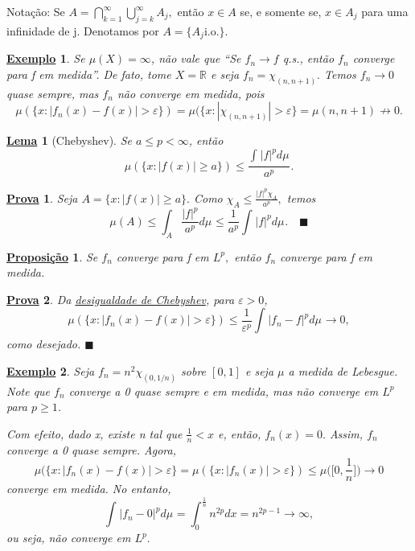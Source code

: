 \documentclass{article}
\newtheorem*{lemma*}{\underline{Lema}}
\newtheorem*{prop*}{\underline{Proposi\c c\~ao}}
\newtheorem{example}{\underline{Exemplo}}
\newtheorem*{proof*}{\underline{Prova}}
\renewcommand\qedsymbol{$\blacksquare$}
\begin{document}
  Notação: Se \(A = \bigcap_{k=1}^{\infty}\bigcup_{j=k}^{\infty}A_{j},\) então \(x\in A\) se, e somente se, \(x\in A_{j}\) para uma infinidade de j. Denotamos por \(A = \{A_{j}\mathrm{i.o.}\}.\)
\begin{example}
  Se \(\mu (X) = \infty\), não vale que ``Se \(f_{n}\to f\) q.s., então \(f_{n}\) converge para f em medida''. De fato, tome \(X = \mathbb{R}\) e seja \(f_{n} = \chi_{(n, n+1)}.\) Temos \(f_{n}\to 0\) quase sempre, mas \(f_{n}\) não converge em medida, pois 
    \[
      \mu (\{x: |f_{n}(x) - f(x)|> \varepsilon \}) = \mu (\{x: |\chi_{(n, n+1)}| > \varepsilon \} = \mu (n, n+1)\not\to 0.
    \]
\end{example}
 \hypertarget{chebyshev}{
   \begin{lemma*}[Chebyshev]
    Se \(a\leq p < \infty\), então 
      \[
        \mu (\{x: |f(x)| \geq a\}) \leq \frac{\int_{}|f|^{p} d\mu_{}}{a^{p}}.
      \]
 \end{lemma*}}
 \begin{proof*}
   Seja \(A = \{x: |f(x)| \geq a\}.\) Como \(\chi_{A} \leq \frac{|f|^{p}\chi_{A}}{a^{p}},\) temos 
     \[
       \mu (A) \leq \int_{A}\frac{|f|^{p}}{a^{p}} d\mu_{} \leq \frac{1}{a^{p}}\int_{}|f|^{p} d\mu_{}. \quad \text{\qedsymbol}
     \]
 \end{proof*}
\begin{prop*}
  Se \(f_{n}\) converge para f em \(L^{p},\) então \(f_{n}\) converge para f em medida.
\end{prop*} 
\begin{proof*}
  Da \hyperlink{chebyshev}{desigualdade de Chebyshev}, para \(\varepsilon >0\), 
    \[
      \mu (\{x: |f_{n}(x) - f(x)| > \varepsilon \}) \leq \frac{1}{\varepsilon ^{p}}\int_{}|f_{n}-f|^{p} d\mu_{}\to 0,
    \]
  como desejado. \qedsymbol
\end{proof*}
\begin{example}
  Seja \(f_{n} = n^{2}\chi_{(0, 1/n)}\) sobre \([0, 1]\) e seja \(\mu \) a medida de Lebesgue. Note que \(f_{n}\) converge a 0 quase sempre e em medida, mas não converge em \(L^{p}\) para \(p \geq 1\).

  Com efeito, dado x, existe n tal que \(\frac{1}{n} < x\) e, então, \(f_{n}(x) = 0.\) Assim, \(f_{n}\) converge a 0 quase sempre. Agora, 
    \[
      \mu (\{x: |f_{n}(x) - f(x)| > \varepsilon \} = \mu (\{x: |f_{n}(x)| > \varepsilon \}) \leq \mu \biggl(\biggl[0, \frac{1}{n}\biggr]\biggr)\to 0
    \]
  converge em medida. No entanto, 
    \[
      \int_{}|f_{n}-0|^{p} d\mu_{} = \int_{0}^{\frac{1}{n}}n^{2p}dx = n^{2p-1}\to \infty,
    \]
  ou seja, não converge em \(L^{p}.\)
\end{example}
\end{document}
